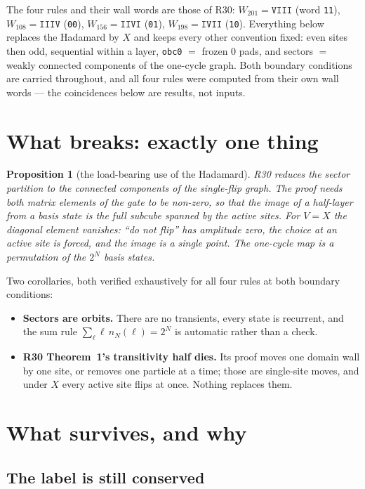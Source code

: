 \documentclass[11pt]{article}
\newcommand{\rt}[1]{\texttt{#1}}
\theoremstyle{plain}
\newtheorem{proposition}{Proposition}
\theoremstyle{remark}
\begin{document}
The four rules and their wall words are those of R30:
$W_{201}=\rt{VIII}$ (word \rt{11}), $W_{108}=\rt{IIIV}$ (\rt{00}),
$W_{156}=\rt{IIVI}$ (\rt{01}), $W_{198}=\rt{IVII}$ (\rt{10}). Everything below
replaces the Hadamard by $X$ and keeps every other convention fixed: even sites
then odd, sequential within a layer, \rt{obc0} $=$ frozen $0$ pads, and sectors
$=$ weakly connected components of the one-cycle graph. Both boundary conditions
are carried throughout, and all four rules were computed from their own wall
words --- the coincidences below are results, not inputs.

\section{What breaks: exactly one thing}

\begin{proposition}[the load-bearing use of the Hadamard]
R30 reduces the sector partition to the connected components of the single-flip
graph. The proof needs both matrix elements of the gate to be non-zero, so that
the image of a half-layer from a basis state is the full subcube spanned by the
active sites. For $V=X$ the diagonal element vanishes: ``do not flip'' has
amplitude zero, the choice at an active site is forced, and the image is a single
point. The one-cycle map is a permutation of the $2^N$ basis states.
\end{proposition}

\noindent Two corollaries, both verified exhaustively for all four rules at both
boundary conditions:

\begin{itemize}
\item \textbf{Sectors are orbits.} There are no transients, every state is
recurrent, and the sum rule $\sum_\ell \ell\, n_N(\ell)=2^N$ is automatic rather
than a check.
\item \textbf{R30 Theorem~1's transitivity half dies.} Its proof moves one domain
wall by one site, or removes one particle at a time; those are single-site moves,
and under $X$ every active site flips at once. Nothing replaces them.
\end{itemize}

\section{What survives, and why}

\subsection{The label is still conserved}
\end{document}
